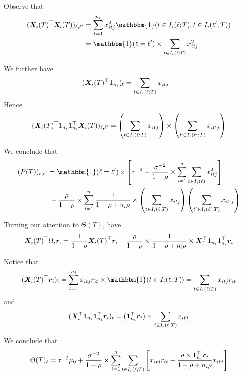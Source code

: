 \documentclass[11pt]{article}
\begin{document}
Observe that
\begin{align*}
(\bX_{i}(T)^{\top}\bX_{i}(T))_{\ell,\ell'} &= \sum_{t = 1}^{n_{i}}{x_{itj}^{2} \mathbbm{1}(t \in I_{i}(\ell;T), t \in I_{i}(\ell',T))} \\
~ &= \mathbbm{1}(\ell = \ell') \times \sum_{t \in I_{i}(\ell;T)}{x_{itj}^{2}}
\end{align*}

We further have
\begin{align*}
(\bm{X}_{i}(T)^{\top}\boldsymbol{1}_{n_{i}})_{\ell} &= \sum_{t \in I_{i}(\ell;T)}{x_{itj}}
\end{align*}
Hence
$$
(\bm{X}_{i}(T)^{\top}\boldsymbol{1}_{n_{i}}\boldsymbol{1}_{n_{i}}^{\top}\bm{X}_{i}(T))_{\ell,\ell'} = \left(\sum_{t \in I_{i}(\ell;T)}{x_{itj}}\right) \times \left(\sum_{t' \in I_{i}(\ell';T)}{x_{it'j}}\right)
$$

We conclude that
\begin{align*}
(P(T))_{\ell,\ell'} &= \mathbbm{1}(\ell = \ell') \times \left[\tau^{-2} + \frac{\sigma^{-2}}{1 - \rho} \times \sum_{i = 1}^{n}{\sum_{t \in I_{i}(\ell)}{x_{itj}^{2}}}\right] \\
&~-\frac{\rho}{1 - \rho} \times \sum_{i = 1}^{n}{\frac{1}{1 - \rho + n_{i}\rho} \times \left(\sum_{t \in I_{i}(\ell;T)}{x_{itj}}\right)\left(\sum_{t' \in I_{i}(\ell';T)}{x_{it'j}}\right)}
\end{align*}

Turning our attention to $\Theta(T)$, have
$$
\bm{X}_{i}(T)^{\top}\Omega_{i}\bm{r}_{i} = \frac{1}{1-\rho}\bm{X}_{i}(T)^{\top}\bm{r}_{i} - \frac{\rho}{1-\rho} \times \frac{1}{1 - \rho + n_{i}\rho} \times \bm{X}_{i}^{\top}\boldsymbol{1}_{n_{i}}\boldsymbol{1}_{n_{i}}^{\top}\bm{r}_{i}
$$

Notice that
$$
(\bX_{i}(T)^{\top}\br_{i})_{\ell} = \sum_{t = 1}^{n_{i}}{x_{itj}r_{it}\times \mathbbm{1}(t \in I_{i}(\ell;T))} = \sum_{t \in I_{i}(\ell;T)}{x_{itj}r_{it}}
$$
and
$$
(\bm{X}_{i}^{\top}\boldsymbol{1}_{n_{i}}\boldsymbol{1}_{n_{i}}^{\top}\bm{r}_{i})_{\ell} = \left(\boldsymbol{1}_{n_{i}}^{\top}\bm{r}_{i}\right) \times \sum_{t \in I_{i}(\ell;T)}{x_{itj}}
$$

We conclude that
$$
\Theta(T)_{\ell} = \tau^{-2}\mu_{0} + \frac{\sigma^{-2}}{1 - \rho} \times \sum_{i = 1}^{n}{\sum_{t \in I_{i}(\ell;T)}{\left[x_{itj}r_{it} - \frac{\rho \times \boldsymbol{1}_{n_{i}}^{\top}\bm{r}_{i}}{1 - \rho + n_{i}\rho}x_{itj}\right]}}
$$





\end{document}
